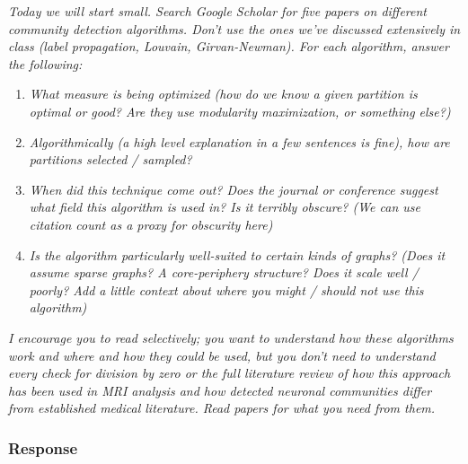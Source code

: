 \documentclass{article}
\newcommand{\response}{\subsubsection*{Response}}
\begin{document}
\textit{Today we will start small. Search Google Scholar for five papers on different community detection algorithms. Don't use the ones we've discussed extensively in class (label propagation, Louvain, Girvan-Newman). For each algorithm, answer the following:}
\begin{enumerate}
    \item \textit{What measure is being optimized (how do we know a given partition is optimal or good? Are they use modularity maximization, or something else?)}
    \item \textit{Algorithmically (a high level explanation in a few sentences is fine), how are partitions selected / sampled?}
    \item \textit{When did this technique come out? Does the journal or conference suggest what field this algorithm is used in? Is it terribly obscure? (We can use citation count as a proxy for obscurity here)}
    \item \textit{Is the algorithm particularly well-suited to certain kinds of graphs? (Does it assume sparse graphs? A core-periphery structure? Does it scale well / poorly? Add a little context about where you might / should not use this algorithm)}
\end{enumerate}
\textit{I encourage you to read selectively; you want to understand how these algorithms work and where and how they could be used, but you don't need to understand every check for division by zero or the full literature review of how this approach has been used in MRI analysis and how detected neuronal communities differ from established medical literature. Read papers for what you need from them.}
\response
\end{document}
